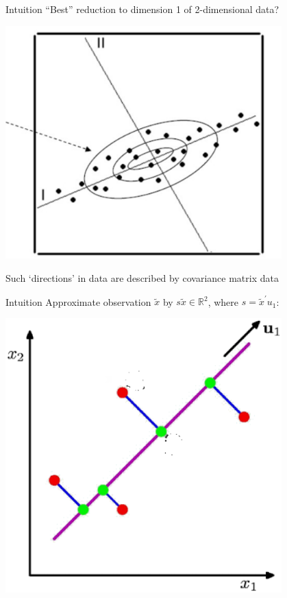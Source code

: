 \documentclass[pdf, handout]{beamer}
\begin{document}
\begin{frame}{Intuition}
``Best'' reduction to dimension 1 of 2-dimensional data?
\begin{center}
\includegraphics[width=0.8\textwidth]{pca-eps-converted-to}
\end{center}
Such `directions' in data are described by covariance matrix data 
\end{frame}




\begin{frame}{Intuition}
Approximate observation $\tilde x$ by  $s \tilde x \in\mathbb{R}^2$, where $s=\tilde x^\prime u_1$:
\begin{center}
\includegraphics[width=0.8\textwidth]{pca2}
\end{center}


\end{frame}
\end{document}
